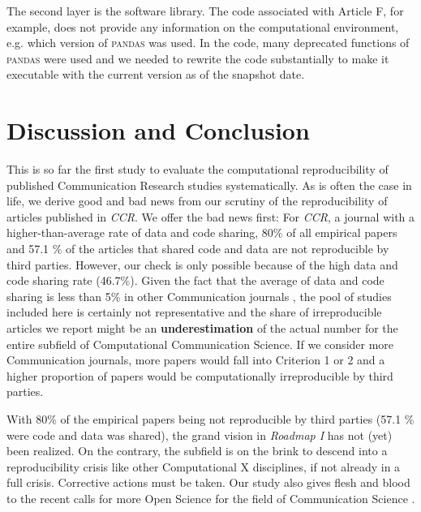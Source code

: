 The second layer is the software library. The code associated with Article {F}, for example, does not provide any information on the computational environment, e.g. which version of \textsc{pandas} was used. In the code, many deprecated functions of \textsc{pandas} were used and we needed to rewrite the code substantially to make it executable with the current version as of the snapshot date.

\section{Discussion and Conclusion}

This is so far the first study to evaluate the computational reproducibility of published Communication Research studies systematically. As is often the case in life, we derive good and bad news from our scrutiny of the reproducibility of articles published in \textit{CCR}. We offer the bad news first: For \textit{CCR}, a journal with a higher-than-average rate of data and code sharing, 80\% of all empirical papers and 57.1 \% of the articles that shared code and data are not reproducible by third parties. However, our check is only possible because of the high data and code sharing rate (46.7\%). Given the fact that the average of data and code sharing is less than 5\% in other Communication journals \parencite[]{haim:2023:H,Knoepfle2024}, the pool of studies included here is certainly not representative and the share of irreproducible articles we report might be an \textbf{underestimation} of the actual number for the entire subfield of Computational Communication Science. If we consider more Communication journals, more papers would fall into Criterion 1 or 2 and a higher proportion of papers would be computationally irreproducible by third parties. 

With 80\% of the empirical papers being not reproducible by third parties (57.1 \% were code and data was shared), the grand vision in \textit{Roadmap I} has not (yet) been realized. On the contrary, the subfield is on the brink to descend into a reproducibility crisis like other Computational X disciplines, if not already in a full crisis. Corrective actions must be taken. Our study also gives flesh and blood to the recent calls for more Open Science for the field of Communication Science  \parencite[]{dienlin:2020:AOS,bowman:2020:CBP,lewis:2019:OCS}.

